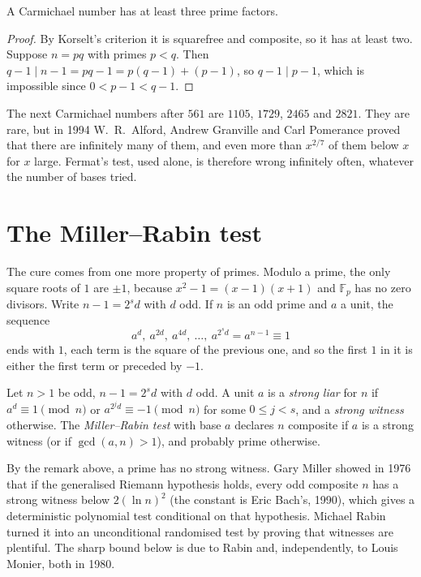 \begin{lemma}\label{lem:carmthree}
A Carmichael number has at least three prime factors.
\end{lemma}
\begin{proof}
By Korselt's criterion it is squarefree and composite, so it has at least two. Suppose $n=pq$ with primes $p<q$. Then $q-1\mid n-1=pq-1=p(q-1)+(p-1)$, so $q-1\mid p-1$, which is impossible since $0<p-1<q-1$.
\end{proof}

The next Carmichael numbers after $561$ are $1105$, $1729$, $2465$ and $2821$. They are rare, but in 1994 W.~R.~Alford, Andrew Granville and Carl Pomerance proved that there are infinitely many of them, and even more than $x^{2/7}$ of them below $x$ for $x$ large. Fermat's test, used alone, is therefore wrong infinitely often, whatever the number of bases tried.

\section{The Miller--Rabin test}\label{sec:millerrabin}

The cure comes from one more property of primes. Modulo a prime, the only square roots of $1$ are $\pm1$, because $x^2-1=(x-1)(x+1)$ and $\mathbb F_p$ has no zero divisors. Write $n-1=2^sd$ with $d$ odd. If $n$ is an odd prime and $a$ a unit, the sequence
\[
a^d,\ a^{2d},\ a^{4d},\ \dots,\ a^{2^sd}=a^{n-1}\equiv1
\]
ends with $1$, each term is the square of the previous one, and so the first $1$ in it is either the first term or preceded by $-1$.

\begin{definition}
Let $n>1$ be odd, $n-1=2^sd$ with $d$ odd. A unit $a$ is a \emph{strong liar} for $n$ if $a^d\equiv1\pmod n$ or $a^{2^jd}\equiv-1\pmod n$ for some $0\le j<s$, and a \emph{strong witness} otherwise. The \emph{Miller--Rabin test} with base $a$ declares $n$ composite if $a$ is a strong witness (or if $\gcd(a,n)>1$), and probably prime otherwise.
\end{definition}

By the remark above, a prime has no strong witness. Gary Miller showed in 1976 that if the generalised Riemann hypothesis holds, every odd composite $n$ has a strong witness below $2(\ln n)^2$ (the constant is Eric Bach's, 1990), which gives a deterministic polynomial test conditional on that hypothesis. Michael Rabin turned it into an unconditional randomised test by proving that witnesses are plentiful.
The sharp bound below is due to Rabin and, independently, to Louis Monier, both in 1980.

